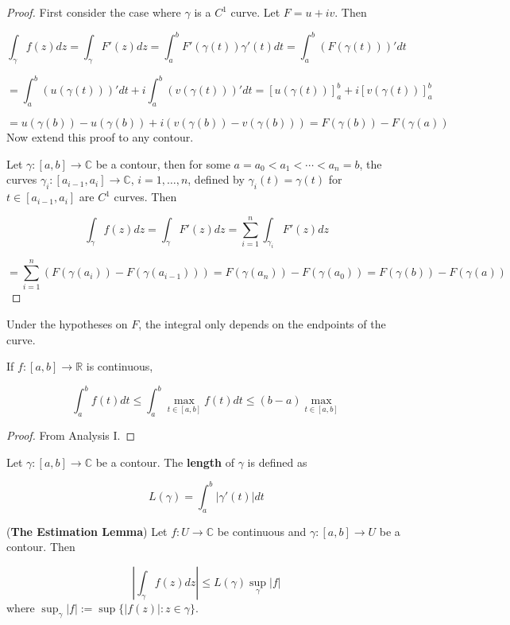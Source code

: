 \begin{proof}
	First consider the case where $\gamma$ is a $C^1$ curve. Let $F = u + iv$. Then

	\[ \int_{\gamma} f(z) dz = \int_{\gamma} F'(z) dz = \int_a^b F'(\gamma(t)) \gamma'(t) dt = \int_a^b (F(\gamma(t)))' dt\]

	\[ = \int_a^b (u(\gamma(t)))' dt + i \int_a^b (v(\gamma(t)))' dt = {[u(\gamma(t))]}_a^b + i {[v(\gamma(t))]}_a^b \]

	\[ = u(\gamma(b)) - u(\gamma(b)) + i(v(\gamma(b)) - v(\gamma(b))) = F(\gamma(b)) - F(\gamma(a)) \]
	Now extend this proof to any contour.

	Let $\gamma: [a, b] \rightarrow \mathbb{C}$ be a contour, then for some $a = a_0 < a_1 < \cdots < a_n = b$, the curves $\gamma_i: [a_{i - 1}, a_i] \rightarrow \mathbb{C}$, $i = 1, \ldots, n$, defined by $\gamma_i(t) = \gamma(t)$ for $t \in [a_{i - 1}, a_i]$ are $C^1$ curves. Then

	\[ \int_{\gamma} f(z) dz = \int_{\gamma} F'(z) dz = \sum_{i = 1}^n \int_{\gamma_i} F'(z) dz \]

	\[ = \sum_{i = 1}^n (F(\gamma(a_i)) - F(\gamma(a_{i - 1}))) = F(\gamma(a_n)) - F(\gamma(a_0)) = F(\gamma(b)) - F(\gamma(a)) \]
\end{proof}

\begin{remark}
	Under the hypotheses on $F$, the integral only depends on the endpoints of the curve.
\end{remark}

\begin{theorem}
	If $f: [a, b] \rightarrow \mathbb{R}$ is continuous,
	
	\[\int_a^b f(t) dt \le \int_a^b \max_{t \in [a, b]} f(t) dt \le (b - a) \max_{t \in [a, b]}\]
\end{theorem}

\begin{proof}
	From Analysis I.
\end{proof}

\begin{definition}
	Let $\gamma: [a, b] \rightarrow \mathbb{C}$ be a contour. The \textbf{length} of $\gamma$ is defined as

	\[L(\gamma) = \int_a^b |\gamma'(t)| dt\]
\end{definition}

\begin{lemma}
	(\textbf{The Estimation Lemma}) Let $f: U \rightarrow \mathbb{C}$ be continuous and $\gamma: [a, b] \rightarrow U$ be a contour. Then

	\[ \left | \int_{\gamma} f(z) dz \right | \le L(\gamma) \sup_{\gamma} |f| \]
	where $\sup_{\gamma} |f| := \sup \{ |f(z)|: z \in \gamma \}$.
\end{lemma}

